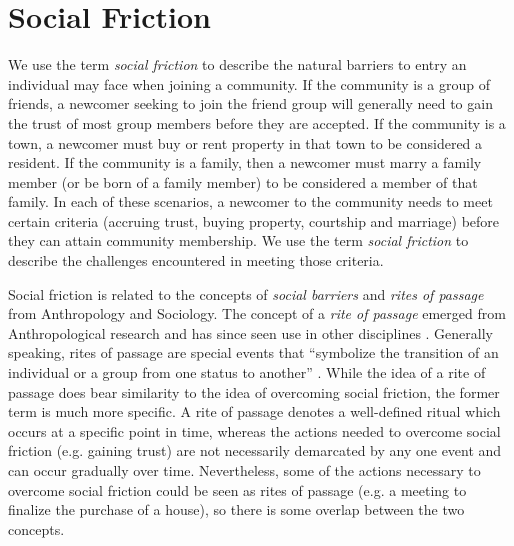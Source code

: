 \documentclass[sigconf,authordraft]{acmart}
\begin{document}
\section{Social Friction}


We use the term {\itshape social friction} to describe the natural barriers to entry an individual may face when joining a community. If the community is a group of friends, a newcomer seeking to join the friend group will generally need to gain the trust of most group members before they are accepted. If the community is a town, a newcomer must buy or rent property in that town to be considered a resident. If the community is a family, then a newcomer must marry a family member (or be born of a family member) to be considered a member of that family. In each of these scenarios, a newcomer to the community needs to meet certain criteria (accruing trust, buying property, courtship and marriage) before they can attain community membership. We use the term {\itshape social friction} to describe the challenges encountered in meeting those criteria. 

Social friction is related to the concepts of {\itshape social barriers} and {\itshape rites of passage} from Anthropology and Sociology. The concept of a {\itshape rite of passage} emerged from Anthropological research and has since seen use in other disciplines \cite{blackwell_ROP,guha2011routledge}. Generally speaking, rites of passage are special events that ``symbolize the transition of an individual or a group from one status to another'' \cite{blackwell_ROP}. While the idea of a rite of passage does bear similarity to the idea of overcoming social friction, the former term is much more specific. A rite of passage denotes a well-defined ritual which occurs at a specific point in time, whereas the actions needed to overcome social friction (e.g. gaining trust) are not necessarily demarcated by any one event and can occur gradually over time. Nevertheless, some of the actions necessary to overcome social friction could be seen as rites of passage (e.g. a meeting to finalize the purchase of a house), so there is some overlap between the two concepts.
\end{document}
